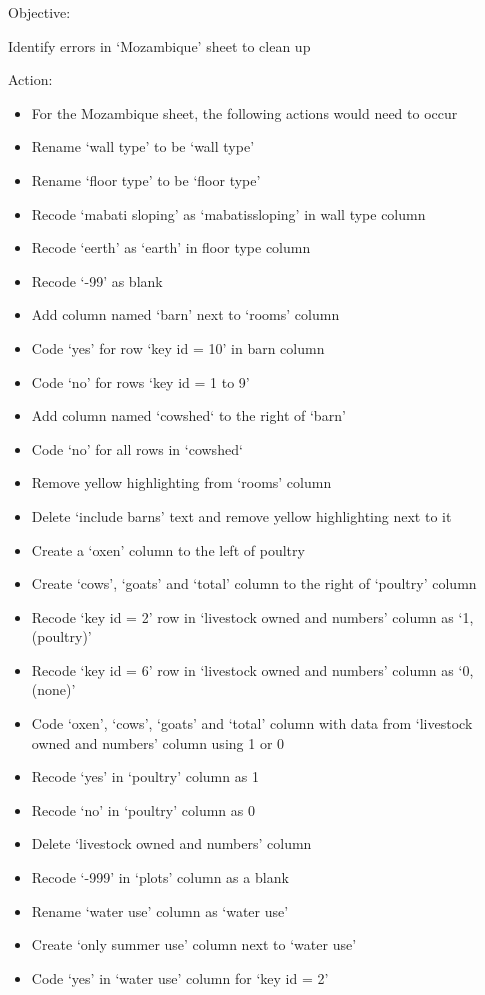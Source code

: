 \documentclass{article}
\begin{document}
Objective:\par 
Identify errors in ‘Mozambique’ sheet to clean up\par
Action: 
\begin{itemize}
\item For the Mozambique sheet, the following actions would need to occur
\item Rename ‘wall type’ to be ‘wall type’
\item Rename ‘floor type’ to be ‘floor type’
\item Recode ‘mabati sloping’ as ‘mabatissloping’ in wall type column
\item Recode ‘eerth’ as ‘earth’ in floor type column
\item Recode ‘-99’ as blank
\item Add column named ‘barn’ next to ‘rooms’ column
\item Code ‘yes’ for row ‘key id = 10’ in barn column
\item Code ‘no’ for rows ‘key id = 1 to 9’
\item Add column named ‘cowshed‘ to the right of ‘barn’
\item Code ‘no’ for all rows in ‘cowshed‘
\item Remove yellow highlighting from ‘rooms’ column
\item Delete ‘include barns’ text and remove yellow highlighting next to it
\item Create a ‘oxen’ column to the left of poultry
\item Create ‘cows’, ‘goats’ and ‘total’ column to the right of ‘poultry’ column
\item Recode ‘key id = 2’ row in ‘livestock owned and numbers’ column as ‘1, (poultry)’
\item Recode ‘key id = 6’ row in ‘livestock owned and numbers’ column as ‘0, (none)’
\item Code ‘oxen’, ‘cows’, ‘goats’ and ‘total’ column with data from ‘livestock owned and numbers’ column using 1 or 0
\item Recode ‘yes’ in ‘poultry’ column as 1
\item Recode ‘no’ in ‘poultry’ column as 0
\item Delete ‘livestock owned and numbers’ column
\item Recode ‘-999’ in ‘plots’ column as a blank
\item Rename ‘water use’ column as ‘water use’
\item Create ‘only summer use’ column next to ‘water use’
\item Code ‘yes’ in ‘water use’ column for ‘key id = 2’

\end{itemize}
\end{document}
